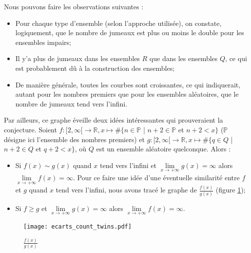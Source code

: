 \documentclass[../main.tex]{subfiles}
\begin{document}
 \newpage
 
 Nous pouvons faire les observations suivantes : 
 	\begin{itemize}
	\item Pour chaque type d'ensemble (selon l'approche utilisée), on constate, logiquement, que le nombre de jumeaux est plus ou moins le double pour les ensembles impairs;
	\item Il y'a plus de jumeaux dans les ensembles $R$ que dans les ensembles $Q$, ce qui est probablement dû à la construction des ensembles;
	\item De manière générale, toutes les courbes sont croissantes, ce qui indiquerait, autant pour les nombres premiers que pour les ensembles aléatoires, que le nombre de jumeaux tend vers l'infini. 
	\end{itemize}
	
	Par ailleurs, ce graphe éveille deux idées intéressantes qui prouveraient la conjecture. Soient $ f : [2, \infty[ \rightarrow \mathbb{R}, x \mapsto \# \{ n \in \mathbb{P}$ | $n+2 \in \mathbb{P}$ et $n+2 < x  \}$  ($\mathbb{P}$ désigne ici l'ensemble des nombres premiers) et $ g : [2, \infty[ \rightarrow \mathbb{R}, x \mapsto \# \{ q \in Q$ | $n+2 \in Q$ et $q+2 < x  \}$, où $Q$ est un ensemble aléatoire quelconque. Alors :
\begin{itemize}
	\item Si $f(x) \sim g(x)$ quand $x$ tend vers l'infini et $\lim\limits_{x \rightarrow +\infty} g(x) = \infty$ alors $\lim\limits_{x \rightarrow +\infty} f(x) = \infty$. Pour ce faire une idée d'une éventuelle similarité entre $f$ et $g$ quand $x$ tend vers l'infini, nous avons tracé le graphe de $\frac{f(x)}{g(x)}$ (figure \ref{im:image6});
	\item Si $f \geqslant g$ et $\lim\limits_{x \rightarrow +\infty} g(x) = \infty$ alors $\lim\limits_{x \rightarrow +\infty} f(x) = \infty$.
\end{itemize}
\begin{figure}[H]
 \centering
 \texttt{[image: ecarts\_count\_twins.pdf]}
 \caption{$\frac{f(x)}{g(x)}$}
 \label{im:image6}
 \end{figure}
\end{document}
